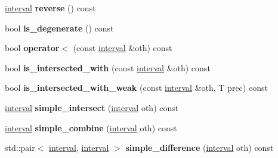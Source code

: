 \begin{DoxyCompactItemize}
\item 
\hyperlink{classgxx_1_1math_1_1interval}{interval} {\bfseries reverse} () const \hypertarget{classgxx_1_1math_1_1interval_afc2e560d5a0cefe858687db39c83f96f}{}\label{classgxx_1_1math_1_1interval_afc2e560d5a0cefe858687db39c83f96f}

\item 
bool {\bfseries is\+\_\+degenerate} () const \hypertarget{classgxx_1_1math_1_1interval_a2c02909c2df7a7ccb8d0039385266aae}{}\label{classgxx_1_1math_1_1interval_a2c02909c2df7a7ccb8d0039385266aae}

\item 
bool {\bfseries operator$<$} (const \hyperlink{classgxx_1_1math_1_1interval}{interval} \&oth) const \hypertarget{classgxx_1_1math_1_1interval_ac5cbf3a84bb47d0265b2e95de0469868}{}\label{classgxx_1_1math_1_1interval_ac5cbf3a84bb47d0265b2e95de0469868}

\item 
bool {\bfseries is\+\_\+intersected\+\_\+with} (const \hyperlink{classgxx_1_1math_1_1interval}{interval} \&oth) const \hypertarget{classgxx_1_1math_1_1interval_a44796ebc0de0bfccdcdd0810225f39b1}{}\label{classgxx_1_1math_1_1interval_a44796ebc0de0bfccdcdd0810225f39b1}

\item 
bool {\bfseries is\+\_\+intersected\+\_\+with\+\_\+weak} (const \hyperlink{classgxx_1_1math_1_1interval}{interval} \&oth, T prec) const \hypertarget{classgxx_1_1math_1_1interval_a39812f98a7c9748f73768aa7793a1a4e}{}\label{classgxx_1_1math_1_1interval_a39812f98a7c9748f73768aa7793a1a4e}

\item 
\hyperlink{classgxx_1_1math_1_1interval}{interval} {\bfseries simple\+\_\+intersect} (\hyperlink{classgxx_1_1math_1_1interval}{interval} oth) const \hypertarget{classgxx_1_1math_1_1interval_afae49443e9f60e7f2014f409bd1bbdf3}{}\label{classgxx_1_1math_1_1interval_afae49443e9f60e7f2014f409bd1bbdf3}

\item 
\hyperlink{classgxx_1_1math_1_1interval}{interval} {\bfseries simple\+\_\+combine} (\hyperlink{classgxx_1_1math_1_1interval}{interval} oth) const \hypertarget{classgxx_1_1math_1_1interval_ac0fce51ce09bf944b42a5076cedae851}{}\label{classgxx_1_1math_1_1interval_ac0fce51ce09bf944b42a5076cedae851}

\item 
std\+::pair$<$ \hyperlink{classgxx_1_1math_1_1interval}{interval}, \hyperlink{classgxx_1_1math_1_1interval}{interval} $>$ {\bfseries simple\+\_\+difference} (\hyperlink{classgxx_1_1math_1_1interval}{interval} oth) const \hypertarget{classgxx_1_1math_1_1interval_a9c2c4f0d560c0a3e9642b1b5859eee1b}{}\label{classgxx_1_1math_1_1interval_a9c2c4f0d560c0a3e9642b1b5859eee1b}


\end{DoxyCompactItemize}
